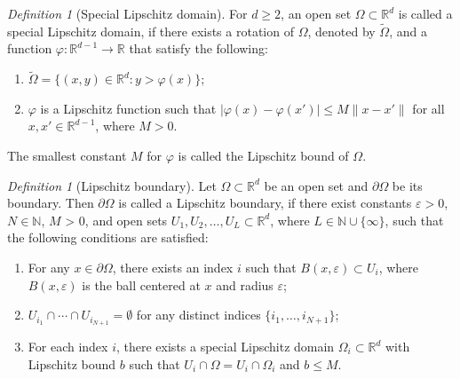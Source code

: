 \documentclass[11pt]{article}
\theoremstyle{remark}
\theoremstyle{example}
\newtheorem{definition}[theorem]{Definition}
\theoremstyle{remark}
\newcommand{\N}{\mathbb{N}}
\newcommand{\R}{\mathbb{R}}
\newcommand{\ve}{\varepsilon}
\newcommand{\citep}{\cite}
\begin{document}

\begin{definition}[Special Lipschitz domain] \label{def:special_Lip}
For $d \geq 2$, an open set $\Omega \subset \R^d$ is called a special Lipschitz domain, if there exists a rotation of $\Omega$, denoted by $\tilde{\Omega}$, and a function $\varphi: \R^{d-1} \to \R$ that satisfy the following:%
\begin{enumerate}
\item 
$\tilde{\Omega} = \{  (x,y) \in \R^d: y > \varphi(x) \}$;\vspace{1mm}
\item $\varphi$ is a Lipschitz function such that  $|\varphi(x) - \varphi (x') | \leq M \| x - x' \|$ for all $x,x' \in \R^{d-1}$, where $M > 0$.%
\end{enumerate}
The smallest constant  $M$ for $\varphi$ is called the Lipschitz bound of $\Omega$.
\end{definition}%

\begin{definition}[Lipschitz boundary] \label{def:Lipschitz_boundary}
Let $\Omega \subset \R^d$ be an open set and $\partial \Omega$ be its boundary.
Then $\partial \Omega$ is called a Lipschitz boundary, if there exist constants $\ve > 0$, $N\in\N$, $M$ > 0, and open sets $U_1,U_2,\dots, U_L \subset \R^d$, where $L \in \mathbb{N} \cup \{ \infty \}$, such that the following conditions are satisfied:%
\begin{enumerate}
\item For any $x \in \partial \Omega$, there exists an index $i$ such that $B(x,\ve) \subset U_i$, where $B(x,\ve)$ is the ball centered at $x$ and radius $\ve$;\vspace{1mm}
\item  $U_{i_1} \cap \cdots \cap U_{i_{N+1}} = \emptyset$ for any distinct indices $\{ i_1,\dots,i_{N+1} \}$;\vspace{1mm}
\item For each index $i$, there exists a special Lipschitz domain $\Omega_i \subset \R^d$ with Lipschitz bound $b$ such that $U_i \cap \Omega = U_i \cap \Omega_i$ and $b\leq M$.
\end{enumerate}
\end{definition}%
\end{document}
